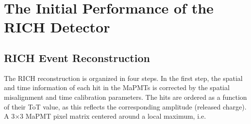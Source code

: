 \documentclass[5p,times,twocolumn]{elsarticle}
\begin{document}
\section{The Initial Performance of the RICH Detector}

\subsection{RICH Event Reconstruction}
\label{sec:RICHReco}

The RICH reconstruction is organized in four steps.
In the first step, the spatial and time information of each hit in the MaPMTs is corrected by the spatial misalignment
and time calibration parameters. The hits are ordered as a function of their ToT value, as this reflects the
corresponding amplitude (released charge). A 3$\times$3 MaPMT pixel matrix centered around a local maximum, i.e.
\end{document}
